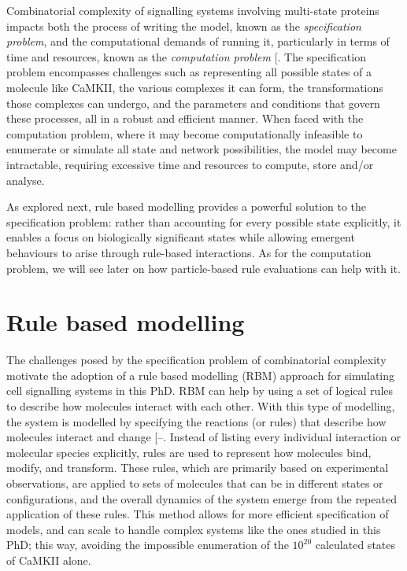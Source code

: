 \documentclass[
  11pt,
  letterpaper,
]{scrreprt}
\begin{document}
Combinatorial complexity of signalling systems involving multi-state
proteins impacts both the process of writing the model, known as the
\emph{specification problem}, and the computational demands of running
it, particularly in terms of time and resources, known as the
\emph{computation problem}
{[}\citeproc{ref-stefan2014Multistate}{283}{]}. The specification
problem encompasses challenges such as representing all possible states
of a molecule like CaMKII, the various complexes it can form, the
transformations those complexes can undergo, and the parameters and
conditions that govern these processes, all in a robust and efficient
manner. When faced with the computation problem, where it may become
computationally infeasible to enumerate or simulate all state and
network possibilities, the model may become intractable, requiring
excessive time and resources to compute, store and/or analyse.

As explored next, rule based modelling provides a powerful solution to
the specification problem: rather than accounting for every possible
state explicitly, it enables a focus on biologically significant states
while allowing emergent behaviours to arise through rule-based
interactions. As for the computation problem, we will see later on how
particle-based rule evaluations can help with it.

\section{Rule based modelling}\label{rule-based-modelling}

The challenges posed by the specification problem of combinatorial
complexity motivate the adoption of a rule based modelling (RBM)
approach for simulating cell signalling systems in this PhD. RBM can
help by using a set of logical rules to describe how molecules interact
with each other. With this type of modelling, the system is modelled by
specifying the reactions (or rules) that describe how molecules interact
and change
{[}--\citeproc{ref-chylek2015Modeling}{289}{]}.
Instead of listing every individual interaction or molecular species
explicitly, rules are used to represent how molecules bind, modify, and
transform. These rules, which are primarily based on experimental
observations, are applied to sets of molecules that can be in different
states or configurations, and the overall dynamics of the system emerge
from the repeated application of these rules. This method allows for
more efficient specification of models, and can scale to handle complex
systems like the ones studied in this PhD; this way, avoiding the
impossible enumeration of the \(10^{20}\) calculated states of CaMKII
alone.
\end{document}
